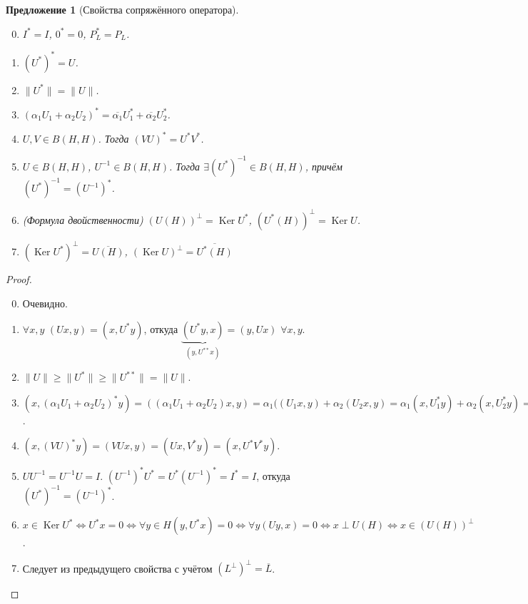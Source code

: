 \documentclass[11pt,openany,a4paper]{scrartcl}
\theoremstyle{plain}
\newtheorem{proposition}[theorem]{Предложение}
\theoremstyle{definition}
\newcommand\ol{\overline}
\DeclareMathOperator{\Ker}{Ker}
\begin{document}
\begin{proposition}[Свойства сопряжённого оператора]
\mbox{}
    \begin{enumerate}
        \setcounter{enumi}{-1}
        \item $I^\ast = I$, $0^\ast = 0$, $P_L^\ast = P_L$.
        \item $(U^\ast)^\ast = U$.
        \item $\|U^\ast\| = \|U\|$.
        \item $(\alpha_1U_1 + \alpha_2U_2)^\ast =
        \ol{\alpha_1}U_1^\ast + \ol{\alpha_2}U_2^\ast$.
        \item $U, V \in B(H, H)$. Тогда $(VU)^\ast = U^\ast V^\ast$.
        \item $U \in B(H, H)$, $U^{-1} \in B(H, H)$. Тогда
        $\exists (U^\ast)^{-1} \in B(H, H)$, причём
        $(U^\ast)^{-1} = (U^{-1})^\ast$.
        \item (Формула двойственности) $(U(H))^\perp = \Ker U^\ast$,
        $(U^\ast(H))^\perp = \Ker U$.
        \item $(\Ker U^\ast)^\perp = \ol{U(H)}$, $(\Ker U)^\perp = \ol{U^\ast(H)}$
    \end{enumerate}
\end{proposition}
\begin{proof}
\mbox{}
    \begin{enumerate}
        \setcounter{enumi}{-1}
        \item Очевидно.
        \item $\forall x,y$ $(Ux, y) = (x, U^\ast y)$, откуда
        $\underbrace{(U^\ast y, x)}_{(y, U^{\ast\ast}x)} = (y, Ux)$ $\forall x,y$.
        \item $\|U\| \geqslant \|U^\ast\| \geqslant \|U^{\ast\ast}\| = \|U\|$.
        \item $(x, (\alpha_1U_1 + \alpha_2U_2)^\ast y) =
        ((\alpha_1U_1 + \alpha_2U_2)x, y) =
        \alpha_1((U_1x, y) + \alpha_2(U_2x, y) =
        \alpha_1(x, U_1^\ast y) + \alpha_2(x, U_2^\ast y) =
        (x, \ol{\alpha_1}U_1^\ast y + \ol{\alpha_2}U_2^\ast y)$.
        \item $(x, (VU)^\ast y) = (VUx, y) = (Ux, V^\ast y) =
        (x, U^\ast V^\ast y)$.
        \item $UU^{-1} = U^{-1}U = I$. $(U^{-1})^\ast U^\ast =
        U^\ast(U^{-1})^\ast = I^\ast = I$, откуда
        $(U^\ast)^{-1} = (U^{-1})^\ast$.
        \item $x \in \Ker U^\ast \iff U^\ast x = 0 \iff \forall y\in H
        (y, U^\ast x) = 0 \iff \forall y (Uy, x) = 0 \iff x \perp U(H) \iff
        x \in (U(H))^\perp$.
        \item Следует из предыдущего свойства с учётом $(L^\perp)^\perp = \ol{L}$.
    \end{enumerate}
\end{proof}
\end{document}
